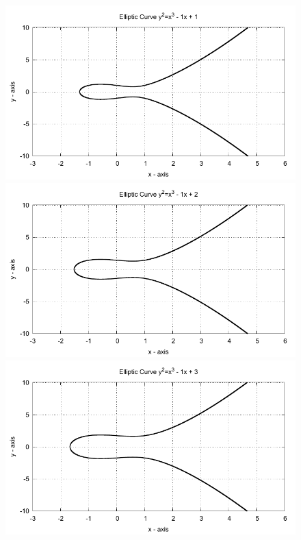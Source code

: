 \begin{figure}[!htbp]

  \begin{minipage}{0.3\textwidth} \centering
    \includegraphics{../Images/ecc_plot/13}
  \end{minipage}
  \begin{minipage}{0.3\textwidth} \centering
    \includegraphics{../Images/ecc_plot/14}
  \end{minipage}
  \begin{minipage}{0.3\textwidth} \centering
    \includegraphics{../Images/ecc_plot/15}
  \end{minipage}
\end{figure}

